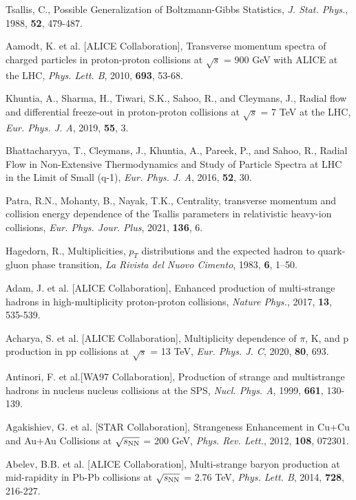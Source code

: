 \documentclass[showpacs,showkeys,aps,twocolumn]{revtex4}
\newcommand\+{\dagger}
\begin{document}
\begin{thebibliography}{99}
Tsallis, C., Possible Generalization of Boltzmann-Gibbs Statistics, {\it J. Stat. Phys.}, 1988, {\bf 52}, 479-487.

Aamodt, K. et al. [ALICE Collaboration], Transverse momentum spectra of charged particles in proton-proton collisions at $\sqrt{s}$ = 900 GeV with ALICE at the LHC, {\it Phys. Lett. B}, 2010, {\bf 693}, 53-68.  

Khuntia, A., Sharma, H., Tiwari, S.K., Sahoo, R., and Cleymans, J., Radial flow and differential freeze-out in proton-proton collisions at $\sqrt{s}$ = 7 TeV at the LHC, {\it Eur. Phys. J. A}, 2019, {\bf 55}, 3.

Bhattacharyya, T., Cleymans, J., Khuntia, A., Pareek, P., and Sahoo, R., Radial Flow in Non-Extensive Thermodynamics and Study of Particle Spectra at LHC in the Limit of Small (q-1), {\it Eur. Phys. J. A}, 2016, {\bf 52}, 30.

Patra, R.N., Mohanty, B., Nayak, T.K., Centrality, transverse momentum and collision energy dependence of the Tsallis parameters in relativistic heavy-ion collisions, {\it Eur. Phys. Jour. Plus}, 2021, {\bf 136}, 6.

Hagedorn, R., Multiplicities, $p_T$ distributions and the expected hadron to quark-gluon phase transition, {\it La Rivista del Nuovo Cimento}, 1983, {\bf 6}, 1–50.

Adam, J. et al. [ALICE Collaboration], Enhanced production of multi-strange hadrons in high-multiplicity proton-proton collisions, {\it Nature Phys.}, 2017, {\bf 13}, 535-539.

Acharya, S. et al. [ALICE Collaboration], Multiplicity dependence of $\pi$, K, and p production in pp collisions at $\sqrt{s}$ = 13 TeV, {\it Eur. Phys. J. C}, 2020, {\bf 80}, 693.

Antinori, F. et al.[WA97 Collaboration], Production of strange and multistrange hadrons in nucleus nucleus collisions at the SPS, {\it Nucl. Phys. A}, 1999, {\bf 661}, 130-139. 

Agakishiev, G. et al. [STAR Collaboration], Strangeness Enhancement in Cu+Cu and Au+Au Collisions at $\sqrt{s_{\rm NN}}$ = 200 GeV, {\it Phys. Rev. Lett.}, 2012, {\bf 108}, 072301. 

Abelev, B.B. et al. [ALICE Collaboration], Multi-strange baryon production at mid-rapidity in Pb-Pb collisions at $\sqrt{s_{\rm NN}}$  = 2.76 TeV, {\it Phys. Lett. B}, 2014, {\bf 728}, 216-227. 


\end{thebibliography}
\end{document}
